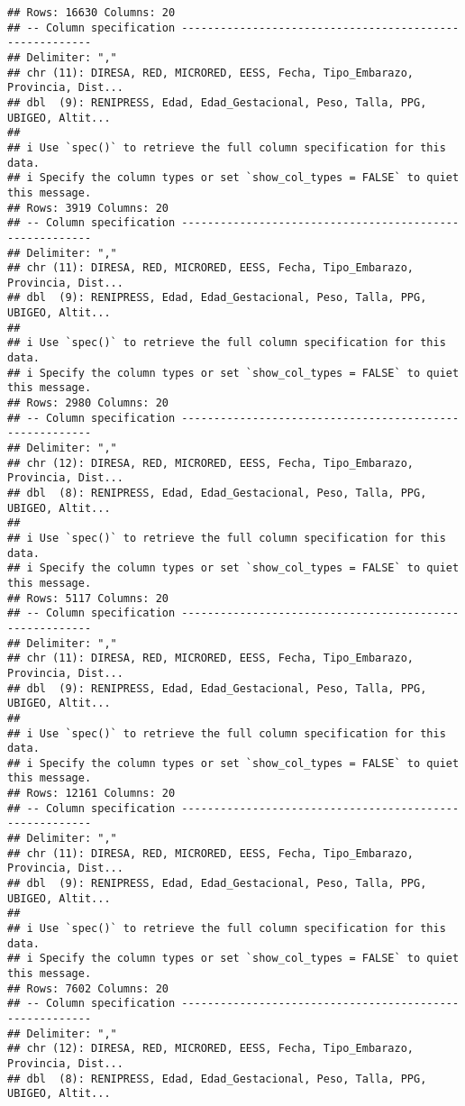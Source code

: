 \documentclass[
]{article}
\begin{document}
\begin{verbatim}
## Rows: 16630 Columns: 20
## -- Column specification --------------------------------------------------------
## Delimiter: ","
## chr (11): DIRESA, RED, MICRORED, EESS, Fecha, Tipo_Embarazo, Provincia, Dist...
## dbl  (9): RENIPRESS, Edad, Edad_Gestacional, Peso, Talla, PPG, UBIGEO, Altit...
## 
## i Use `spec()` to retrieve the full column specification for this data.
## i Specify the column types or set `show_col_types = FALSE` to quiet this message.
## Rows: 3919 Columns: 20
## -- Column specification --------------------------------------------------------
## Delimiter: ","
## chr (11): DIRESA, RED, MICRORED, EESS, Fecha, Tipo_Embarazo, Provincia, Dist...
## dbl  (9): RENIPRESS, Edad, Edad_Gestacional, Peso, Talla, PPG, UBIGEO, Altit...
## 
## i Use `spec()` to retrieve the full column specification for this data.
## i Specify the column types or set `show_col_types = FALSE` to quiet this message.
## Rows: 2980 Columns: 20
## -- Column specification --------------------------------------------------------
## Delimiter: ","
## chr (12): DIRESA, RED, MICRORED, EESS, Fecha, Tipo_Embarazo, Provincia, Dist...
## dbl  (8): RENIPRESS, Edad, Edad_Gestacional, Peso, Talla, PPG, UBIGEO, Altit...
## 
## i Use `spec()` to retrieve the full column specification for this data.
## i Specify the column types or set `show_col_types = FALSE` to quiet this message.
## Rows: 5117 Columns: 20
## -- Column specification --------------------------------------------------------
## Delimiter: ","
## chr (11): DIRESA, RED, MICRORED, EESS, Fecha, Tipo_Embarazo, Provincia, Dist...
## dbl  (9): RENIPRESS, Edad, Edad_Gestacional, Peso, Talla, PPG, UBIGEO, Altit...
## 
## i Use `spec()` to retrieve the full column specification for this data.
## i Specify the column types or set `show_col_types = FALSE` to quiet this message.
## Rows: 12161 Columns: 20
## -- Column specification --------------------------------------------------------
## Delimiter: ","
## chr (11): DIRESA, RED, MICRORED, EESS, Fecha, Tipo_Embarazo, Provincia, Dist...
## dbl  (9): RENIPRESS, Edad, Edad_Gestacional, Peso, Talla, PPG, UBIGEO, Altit...
## 
## i Use `spec()` to retrieve the full column specification for this data.
## i Specify the column types or set `show_col_types = FALSE` to quiet this message.
## Rows: 7602 Columns: 20
## -- Column specification --------------------------------------------------------
## Delimiter: ","
## chr (12): DIRESA, RED, MICRORED, EESS, Fecha, Tipo_Embarazo, Provincia, Dist...
## dbl  (8): RENIPRESS, Edad, Edad_Gestacional, Peso, Talla, PPG, UBIGEO, Altit...

\end{verbatim}
\end{document}
